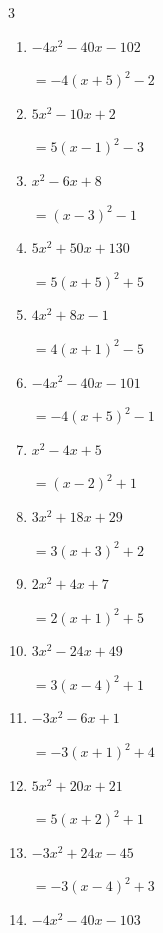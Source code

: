 \begin{multicols}{3}
\begin{enumerate}
        $=-2\left( x+3\right)^{2}+5$

  \item $-4x^{2}-40x-102$

        $=-4\left( x+5\right)^{2}-2$

  \item $5x^{2}-10x+2$

        $=5\left( x-1\right)^{2}-3$

\columnbreak %

  \item $x^{2}-6x+8$

        $=\left( x-3\right)^{2}-1$

  \item $5x^{2}+50x+130$

        $=5\left( x+5\right)^{2}+5$

  \item $4x^{2}+8x-1$

        $=4\left( x+1\right)^{2}-5$

  \item $-4x^{2}-40x-101$

        $=-4\left( x+5\right)^{2}-1$

  \item $x^{2}-4x+5$

        $=\left( x-2\right)^{2}+1$

  \item $3x^{2}+18x+29$

        $=3\left( x+3\right)^{2}+2$

  \item $2x^{2}+4x+7$

        $=2\left( x+1\right)^{2}+5$

  \item $3x^{2}-24x+49$

        $=3\left( x-4\right)^{2}+1$

  \item $-3x^{2}-6x+1$

        $=-3\left( x+1\right)^{2}+4$

  \item $5x^{2}+20x+21$

        $=5\left( x+2\right)^{2}+1$

\columnbreak %

  \item $-3x^{2}+24x-45$

        $=-3\left( x-4\right)^{2}+3$

  \item $-4x^{2}-40x-103$


\end{enumerate}
\end{multicols}
